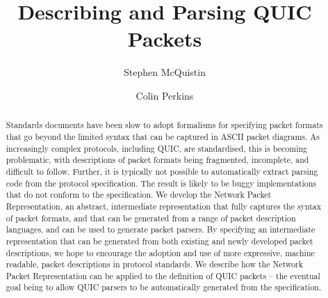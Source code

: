 \documentclass[10pt,sigconf]{acmart}
\begin{document}
\title{Describing and Parsing QUIC Packets}

\author{Stephen McQuistin}

\author{Colin Perkins}

\begin{abstract}


  Standards documents have been slow to adopt formalisms for specifying
  packet formats that go beyond the limited syntax that can be captured
  in ASCII packet diagrams. 
  As increasingly complex protocols, including QUIC, are standardised,
  this is becoming problematic, with descriptions of packet formats being
  fragmented, incomplete, and difficult to follow.
  Further, it is typically not possible to automatically extract parsing
  code from the protocol specification.
  The result is likely to be buggy implementations that do not conform
  to the specification.
  We develop the Network Packet Representation, an abstract, intermediate
  representation that fully captures the syntax of packet formats, and
  that can be generated from a range of packet description languages,
  and can be used to generate packet parsers.
  By specifying an intermediate representation that can be generated from
  both existing and newly developed packet descriptions, we hope to
  encourage the adoption and use of more expressive, machine readable,
  packet descriptions in protocol standards.
  We describe how the Network Packet Representation can be applied to
  the definition of QUIC packets -- the eventual goal being to allow QUIC
  parsers to be automatically generated from the specification.

\end{abstract}
\maketitle
\end{document}
